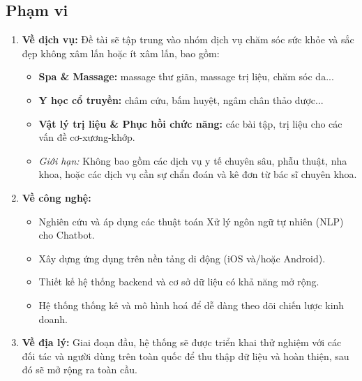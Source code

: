 \subsection{Phạm vi}
\begin{enumerate}
    \item \textbf{Về dịch vụ:} Đề tài sẽ tập trung vào nhóm dịch vụ chăm sóc sức khỏe và sắc đẹp không xâm lấn hoặc ít xâm lấn, bao gồm: 
    \begin{itemize}
        \item \textbf{Spa \& Massage:}  massage thư giãn, massage trị liệu, chăm sóc da...
        \item \textbf{Y học cổ truyền:} châm cứu, bấm huyệt, ngâm chân thảo dược...
        \item \textbf{Vật lý trị liệu \& Phục hồi chức năng:} các bài tập, trị liệu cho các vấn đề cơ-xương-khớp.
        \item \textit{Giới hạn:} Không bao gồm các dịch vụ y tế chuyên sâu, phẫu thuật, nha khoa, hoặc các dịch vụ cần sự chẩn đoán và kê đơn từ bác sĩ chuyên khoa. 
    \end{itemize}
    \item \textbf{Về công nghệ:} 
    \begin{itemize}
        \item Nghiên cứu và áp dụng các thuật toán Xử lý ngôn ngữ tự nhiên (NLP) cho Chatbot.
        \item Xây dựng ứng dụng trên nền tảng di động (iOS và/hoặc Android).
        \item Thiết kế hệ thống backend và cơ sở dữ liệu có khả năng mở rộng.
        \item Hệ thống thống kê và mô hình hoá để dễ dàng theo dõi chiến lược kinh doanh.
    \end{itemize}
    \item \textbf{Về địa lý:} Giai đoạn đầu, hệ thống sẽ được triển khai thử nghiệm với các đối tác và người dùng trên toàn quốc để thu thập dữ liệu và hoàn thiện, sau đó sẽ mở rộng ra toàn cầu.

\end{enumerate}
